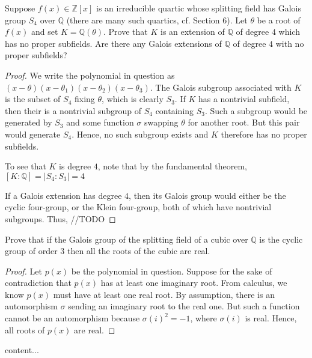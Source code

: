 \documentclass[10pt]{article}
\newcommand{\Z}{\mathbb{Z}}
\newcommand{\Q}{\mathbb{Q}}
\newenvironment{problem}[2][Problem]{\begin{trivlist}
		\item[\hskip \labelsep {\bfseries #1}\hskip \labelsep {\bfseries #2.}]}{\end{trivlist}}
\begin{document}
	\begin{problem}{2.11}
		Suppose $f(x) \in \Z[x]$ is an irreducible quartic whose splitting field has Galois group $S_4$ over $\Q$ (there are many such quartics, cf. Section 6). Let $\theta$ be a root of $f(x)$ and set $K = \Q(\theta)$. Prove that $K$ is an extension of $\Q$ of degree $4$ which has no proper subfields. Are there any Galois extensions of $\Q$ of degree $4$ with no proper subfields?
		\begin{proof}
			We write the polynomial in question as $(x - \theta)(x - \theta_1)(x - \theta_2)(x - \theta_3)$. The Galois subgroup associated with $K$ is the subset of $S_4$ fixing $\theta$, which is clearly $S_3$. If $K$ has a nontrivial subfield, then their is a nontrivial subgroup of $S_4$ containing $S_3$. Such a subgroup would be generated by $S_3$ and some function $\sigma$ swapping $\theta$ for another root. But this pair would generate $S_4$. Hence, no such subgroup exists and $K$ therefore has no proper subfields.
			
			To see that $K$ is degree $4$, note that by the fundamental theorem, $[K:\Q] = |S_4:S_3| = 4$
			
			If a Galois extension has degree $4$, then its Galois group would either be the cyclic four-group, or the Klein four-group, both of which have nontrivial subgroups. Thus, //TODO
		\end{proof}
	\end{problem}
	
	\begin{problem}{2.13}
		Prove that if the Galois group of the splitting field of a cubic over $\Q$ is the cyclic group of order $3$ then all the roots of the cubic are real.
		\begin{proof}
			Let $p(x)$ be the polynomial in question. Suppose for the sake of contradiction that $p(x)$ has at least one imaginary root. From calculus, we know $p(x)$ must have at least one real root. By assumption, there is an automorphism $\sigma$ sending an imaginary root to the real one. But such a function cannot be an automorphism because $\sigma(i)^2 = -1$, where $\sigma(i)$ is real. Hence, all roots of $p(x)$ are real.
		\end{proof}
	\end{problem}
	
	\begin{problem}{2.15}
		content...
	\end{problem}
\end{document}
